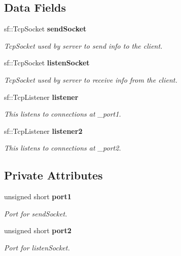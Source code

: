 \subsection*{Data Fields}
\begin{DoxyCompactItemize}
\item 
sf\+::\+Tcp\+Socket {\bf send\+Socket}\label{classServer_a7105cc8419a6e5b9f4ef920bbbcef602}

\begin{DoxyCompactList}\small\item\em Tcp\+Socket used by server to send info to the client. \end{DoxyCompactList}\item 
sf\+::\+Tcp\+Socket {\bf listen\+Socket}\label{classServer_a936d5843a7c2608fc578ba5314547468}

\begin{DoxyCompactList}\small\item\em Tcp\+Socket used by server to receive info from the client. \end{DoxyCompactList}\item 
sf\+::\+Tcp\+Listener {\bf listener}\label{classServer_ab9887f2575ed797c9ac0dd43004a6fc8}

\begin{DoxyCompactList}\small\item\em This listens to connections at \+\_\+port1. \end{DoxyCompactList}\item 
sf\+::\+Tcp\+Listener {\bf listener2}\label{classServer_a54bb5c13f9d06d80d438b3ad484b1729}

\begin{DoxyCompactList}\small\item\em This listens to connections at \+\_\+port2. \end{DoxyCompactList}\end{DoxyCompactItemize}
\subsection*{Private Attributes}
\begin{DoxyCompactItemize}
\item 
unsigned short {\bf port1}\label{classServer_a47b2c62bc2a6801bc0ce543cb9b29e15}

\begin{DoxyCompactList}\small\item\em Port for send\+Socket. \end{DoxyCompactList}\item 
unsigned short {\bf port2}\label{classServer_a1377fadd5460fb552d35e6b53d27d95d}

\begin{DoxyCompactList}\small\item\em Port for listen\+Socket. \end{DoxyCompactList}\end{DoxyCompactItemize}


